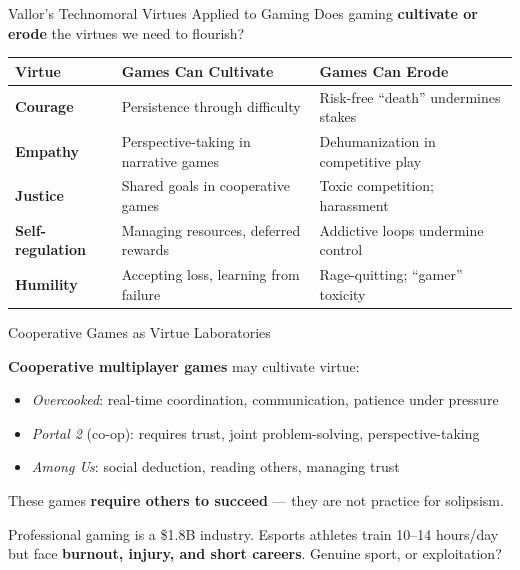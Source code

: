 \documentclass[aspectratio=169,11pt]{beamer}
\begin{document}
\begin{frame}[t]{Vallor's Technomoral Virtues Applied to Gaming}
\footnotesize
Does gaming \textbf{cultivate or erode} the virtues we need to flourish? \parencite{vallor_technology_virtues}

\vspace{0.1cm}
\begin{center}
\scriptsize
\begin{tabular}{p{2.5cm}p{3.8cm}p{4cm}}
\toprule
\textbf{Virtue} & \textbf{Games Can Cultivate} & \textbf{Games Can Erode} \\
\midrule
\textbf{Courage} & Persistence through difficulty & Risk-free ``death'' undermines stakes \\
\textbf{Empathy} & Perspective-taking in narrative games & Dehumanization in competitive play \\
\textbf{Justice} & Shared goals in cooperative games & Toxic competition; harassment \\
\textbf{Self-regulation} & Managing resources, deferred rewards & Addictive loops undermine control \\
\textbf{Humility} & Accepting loss, learning from failure & Rage-quitting; ``gamer'' toxicity \\
\bottomrule
\end{tabular}
\end{center}
\end{frame}

\begin{frame}[t]{Cooperative Games as Virtue Laboratories}
\begin{probox}
\footnotesize
\textbf{Cooperative multiplayer games} may cultivate virtue:
\begin{itemize}
    \item \emph{Overcooked}: real-time coordination, communication, patience under pressure
    \item \emph{Portal 2} (co-op): requires trust, joint problem-solving, perspective-taking
    \item \emph{Among Us}: social deduction, reading others, managing trust
\end{itemize}
These games \textbf{require others to succeed} --- they are not practice for solipsism.
\end{probox}

\vspace{0.05cm}
\begin{casestudybox}
\footnotesize
Professional gaming is a \$1.8B industry. Esports athletes train 10--14 hours/day but face \textbf{burnout, injury, and short careers}. Genuine sport, or exploitation?
\end{casestudybox}
\end{frame}
\end{document}
